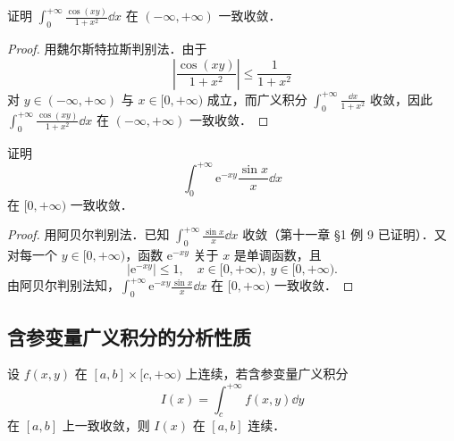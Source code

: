\begin{example}\label{ex:19-2-2}
证明 $\displaystyle\int_{0}^{+\infty}\frac{\cos(xy)}{1+x^{2}}\dd x$ 在 $(-\infty,+\infty)$ 一致收敛．
\end{example}

\begin{proof}
用魏尔斯特拉斯判别法．由于
\[
\left|\frac{\cos(xy)}{1+x^{2}}\right|\leqslant\frac{1}{1+x^{2}}
\]
对 $y\in(-\infty,+\infty)$ 与 $x\in[0,+\infty)$ 成立，而广义积分 $\displaystyle\int_{0}^{+\infty}\frac{\dd x}{1+x^{2}}$ 收敛，因此 $\displaystyle\int_{0}^{+\infty}\frac{\cos(xy)}{1+x^{2}}\dd x$ 在 $(-\infty,+\infty)$ 一致收敛．
\end{proof}

\begin{example}\label{ex:19-2-3}
证明
\[
\int_{0}^{+\infty}\mathrm{e}^{-xy}\frac{\sin x}{x}\dd x
\]
在 $[0,+\infty)$ 一致收敛．
\end{example}

\begin{proof}
用阿贝尔判别法．已知 $\displaystyle\int_{0}^{+\infty}\frac{\sin x}{x}\dd x$ 收敛（第十一章 §1 例 9 已证明）．又对每一个 $y\in[0,+\infty)$，函数 $\mathrm{e}^{-xy}$ 关于 $x$ 是单调函数，且
\[
\left|\mathrm{e}^{-xy}\right|\leqslant 1,\quad x\in[0,+\infty),\ y\in[0,+\infty).
\]
由阿贝尔判别法知，$\displaystyle\int_{0}^{+\infty}\mathrm{e}^{-xy}\frac{\sin x}{x}\dd x$ 在 $[0,+\infty)$ 一致收敛．
\end{proof}

\subsection{含参变量广义积分的分析性质}

\begin{theorem}[积分号下取极限]\label{thm:19-11}
设 $f(x,y)$ 在 $[a,b]\times[c,+\infty)$ 上连续，若含参变量广义积分
\[
I(x)=\int_{c}^{+\infty}f(x,y)\dd y
\]
在 $[a,b]$ 上一致收敛，则 $I(x)$ 在 $[a,b]$ 连续．
\end{theorem}

